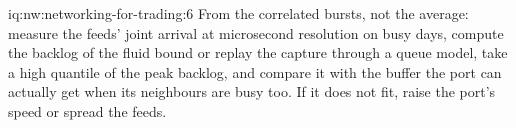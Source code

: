 \begin{solution}{iq:nw:networking-for-trading:6}
From the correlated bursts, not the average: measure the feeds' joint arrival at microsecond resolution on busy days, compute the
backlog of the fluid bound or replay the capture through a queue model, take a high quantile of the peak backlog, and compare it
with the buffer the port can actually get when its neighbours are busy too. If it does not fit, raise the port's speed or spread
the feeds.
\end{solution}
